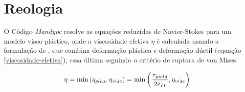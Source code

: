 




\section{Reologia}
\label{sec:reologia}

O Código \textit{Mandyoc} resolve as equações reduzidas de Navier-Stokes para um modelo visco-plástico, onde a viscosidade efetiva $\eta$ é calculada usando a formulação de \citet{moresisolomatov1998}, que combina deformação plástica e deformação dúctil (equação \ref{viscosidade-efetiva}), essa última seguindo o critério de ruptura de von Mises.

\begin{equation}{\label{viscosidade-efetiva}}
    \eta = \min{(\eta_{plas},\eta_{visc})} = \min{\bigg(\frac{\tau_{yield}}{2\dot{\varepsilon}_{II}},\eta_{visc}\bigg)}
\end{equation}

